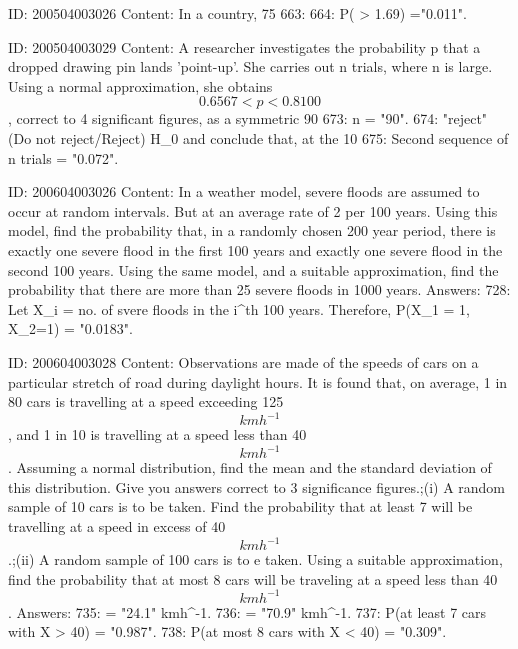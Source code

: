 \documentclass{article}
\begin{document}
ID: 200504003026
Content:
In a country, 75%
663: 
664: P( > 1.69) ="0.011".

ID: 200504003029
Content:
A researcher investigates the probability p that a dropped drawing pin lands 'point-up'. She carries out n trials, where n is large. Using a normal approximation, she obtains $$0.6567 < p < 0.8100$$, correct to 4 significant figures, as a symmetric 90%
673: n = "90".
674: "reject" (Do not reject/Reject) H_0 and conclude that, at the 10%
675: Second sequence of n trials = "0.072".

ID: 200604003026
Content:
In a weather model, severe floods are assumed to occur at random intervals. But at an average rate of 2 per 100 years. Using this model, find the probability that, in a randomly chosen 200 year period, there is exactly one severe flood in the first 100 years and exactly one severe flood in the second 100 years.  Using the same model, and a suitable approximation, find the probability that there are more than 25 severe floods in 1000 years. Answers:
728: Let X_i = no. of svere floods in the i^{th} 100 years. Therefore, P(X_1 = 1, X_2=1) = "0.0183".

ID: 200604003028
Content:
Observations are made of the speeds of cars on a particular stretch of road during daylight hours. It is found that, on average, 1 in 80 cars is travelling at a speed exceeding 125 $$km h^{-1}$$, and 1 in 10 is travelling at a speed less than 40 $$km h^{-1}$$. Assuming a normal distribution, find the mean and the standard deviation of this distribution. Give you answers correct to 3 significance figures.;(i) A random sample of 10 cars is to be taken. Find the probability that at least 7 will be travelling at a speed in excess of 40 $$km h^{-1}$$.;(ii) A random sample of 100 cars is to e taken. Using a suitable approximation, find the probability that at most 8 cars will be traveling at a speed less than 40 $$km h^{-1}$$. Answers:
735: \sigma = "24.1" kmh^{-1}.
736: \mu = "70.9" kmh^{-1}.
737: P(at least 7 cars with X > 40) = "0.987".
738: P(at most 8 cars with X < 40) = "0.309".
\end{document}
